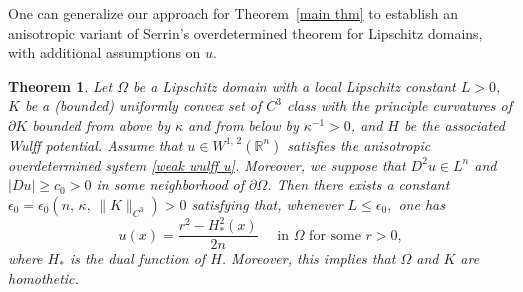 \documentclass[reqno,11pt]{amsart}
\def\dist{{\mathop\mathrm{\,dist\,}}}
\def\ez{\epsilon}
\def\bint{{\ifinner\rlap{\bf\kern.35em--}
\int\else\rlap{\bf\kern.45em--}\int\fi}\ignorespaces}
\newtheorem{thm}{Theorem}[section]
\numberwithin{equation}{section}
\theoremstyle{remark}
\def\bint{{\ifinner\rlap{\bf\kern.35em--}
\int\else\rlap{\bf\kern.45em--}\int\fi}\ignorespaces}
\begin{document}
 One can generalize our approach for Theorem~\ref{main thm}  to establish an anisotropic variant of Serrin's overdetermined theorem for Lipschitz domains, with additional assumptions on $u$.


\begin{thm}\label{main thm 2}
    Let $\Omega$ be a Lipschitz domain with a local Lipschitz constant $L>0$, $K$ be a (bounded) uniformly convex set of $C^{3}$ class with the principle curvatures of $\partial K$ bounded from above by $\kappa$ and from below by $\kappa^{-1}>0$, 
    and $H$ be the associated Wulff potential.
    Assume that $u\in W^{1,\,2}(\mathbb R^n) $
    satisfies the anisotropic overdetermined system \eqref{weak wulff u}. Moreover, we suppose that $D^2u\in L^n$ and $|Du|\ge c_0>0$ in some neighborhood of $\partial \Omega$. Then there exists a constant $\ez_0=\ez_0(n,\,\kappa,\,\|K\|_{C^{3}})>0$ satisfying that, whenever
    $ L \le \ez_0,$
    one has
    $$u(x)=\frac{r^2-H_*^2(x)}{2n} \quad \text{ in  }  \Omega  \text{ for some $r>0$,}$$
where $H_*$ is the dual function of $H$. Moreover, this implies that $\Omega$ and $K$ are homothetic. 
\end{thm}
\end{document}
